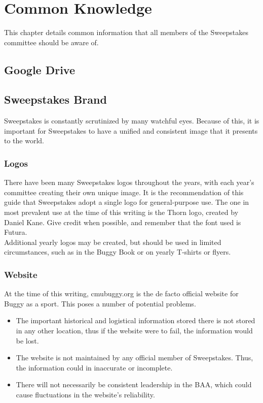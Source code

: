 \chapter{Common Knowledge}
\label{ch:Common}

This chapter details common information that all members of the Sweepstakes
committee should be aware of.

\section{Google Drive}


\section{Sweepstakes Brand}
Sweepstakes is constantly scrutinized by many watchful eyes. Because of this,
it is important for Sweepstakes to have a unified and consistent image that
it presents to the world.

\subsection{Logos}
\label{subsec:Logos}
There have been many Sweepstakes logos throughout the years, with each year's
committee creating their own unique image. It is the recommendation of this
guide that Sweepstakes adopt a single logo for general-purpose use. The one in
most prevalent use at the time of this writing is the Thorn logo, created by
Daniel Kane. Give credit when possible, and remember that the font used is
Futura.
\\
Additional yearly logos may be created, but should be used in limited
circumstances, such as in the Buggy Book or on yearly T-shirts or flyers.

\subsection{Website}
\label{subsec:Website}
At the time of this writing, cmubuggy.org is the de facto official website for
Buggy as a sport. This poses a number of potential problems.

\begin{itemize}
\item The important historical and logistical information stored there is
  not stored in any other location, thus if the website were to fail,
  the information would be lost.
\item The website is not maintained by any official member of Sweepstakes.
  Thus, the information could in inaccurate or incomplete.
\item There will not necessarily be consistent leadership in the BAA,
  which could cause fluctuations in the website's reliability.
\end{itemize}


